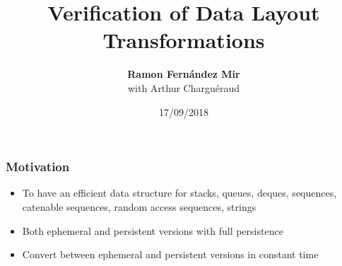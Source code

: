 \def\macrosUseBeamer{}




\usepackage{multicol}

\newcommand\tab{$\hphantom{--}$}





\title{Verification of Data Layout Transformations}
\author[Ramon Fern\'{a}ndez Mir]{{\bf Ramon Fern\'{a}ndez Mir}\\ \vspace{1em} with Arthur Charguéraud }
\date{17/09/2018}

\frame{\titlepage}




\begin{frame}[fragile]
\frametitle{Motivation}

\begin{itemize}
	\setlength\itemsep{1.5em}
	\item To have an efficient data structure for stacks, queues, deques, sequences, catenable sequences, random access sequences, strings\\
	\item Both ephemeral and persistent versions with full persistence\\
	\item Convert between ephemeral and persistent versions in constant time
\end{itemize}

\end{frame}


